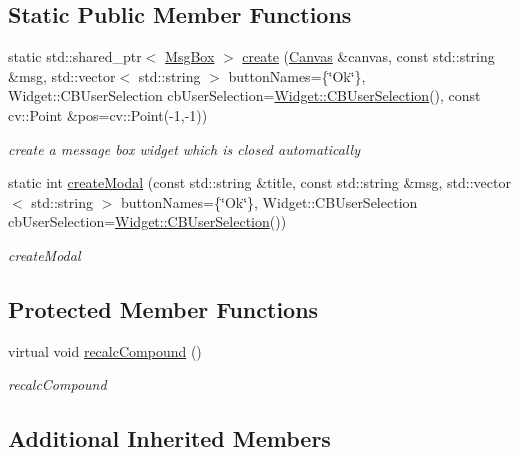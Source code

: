 \subsection*{Static Public Member Functions}
\begin{DoxyCompactItemize}
\item 
static std\+::shared\+\_\+ptr$<$ \hyperlink{classcanvascv_1_1MsgBox}{Msg\+Box} $>$ \hyperlink{classcanvascv_1_1MsgBox_a3bf0019e83e367e415da29286db2c5d0}{create} (\hyperlink{classcanvascv_1_1Canvas}{Canvas} \&canvas, const std\+::string \&msg, std\+::vector$<$ std\+::string $>$ button\+Names=\{\char`\"{}Ok\char`\"{}\}, Widget\+::\+C\+B\+User\+Selection cb\+User\+Selection=\hyperlink{classcanvascv_1_1Widget_a977cbd39cf203c5866f07f3645c7e4bc}{Widget\+::\+C\+B\+User\+Selection}(), const cv\+::\+Point \&pos=cv\+::\+Point(-\/1,-\/1))
\begin{DoxyCompactList}\small\item\em create a message box widget which is closed automatically \end{DoxyCompactList}\item 
static int \hyperlink{classcanvascv_1_1MsgBox_a1eb6af15c2393ce6cda9ce277c01d200}{create\+Modal} (const std\+::string \&title, const std\+::string \&msg, std\+::vector$<$ std\+::string $>$ button\+Names=\{\char`\"{}Ok\char`\"{}\}, Widget\+::\+C\+B\+User\+Selection cb\+User\+Selection=\hyperlink{classcanvascv_1_1Widget_a977cbd39cf203c5866f07f3645c7e4bc}{Widget\+::\+C\+B\+User\+Selection}())
\begin{DoxyCompactList}\small\item\em create\+Modal \end{DoxyCompactList}\end{DoxyCompactItemize}
\subsection*{Protected Member Functions}
\begin{DoxyCompactItemize}
\item 
virtual void \hyperlink{classcanvascv_1_1MsgBox_a1eea452acb76e5a5a0588bf83cc91325}{recalc\+Compound} ()
\begin{DoxyCompactList}\small\item\em recalc\+Compound \end{DoxyCompactList}\end{DoxyCompactItemize}
\subsection*{Additional Inherited Members}


